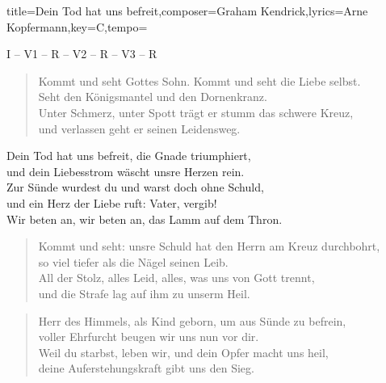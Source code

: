 \documentclass{leadsheet}
\begin{document}
\begin{song}{title={Dein Tod hat uns befreit},composer={Graham Kendrick},lyrics={Arne Kopfermann},key={C},tempo={}}

\begin{schedule}
I -- V1 -- R -- V2 -- R -- V3 -- R
\end{schedule}

\begin{intro}
\end{intro}

\begin{verse}
Kommt und seht Gottes Sohn.
Kommt und seht die Liebe selbst. \\
Seht den Königsmantel und den Dornenkranz. \\
Unter Schmerz, unter Spott
trägt er stumm das schwere Kreuz, \\
und verlassen geht er seinen Leidensweg.
\end{verse}

\begin{chorus}
Dein Tod hat uns befreit,
die Gnade triumphiert, \\
und dein Liebesstrom
wäscht unsre Herzen rein. \\
Zur Sünde wurdest du
und warst doch ohne Schuld, \\
und ein Herz der Liebe ruft: Vater, vergib! \\
Wir beten an, wir beten an,
das Lamm auf dem Thron.
\end{chorus}

\begin{verse}
Kommt und seht: unsre Schuld
hat den Herrn am Kreuz durchbohrt, \\
so viel tiefer als die Nägel seinen Leib. \\
All der Stolz, alles Leid,
alles, was uns von Gott trennt, \\
und die Strafe lag auf ihm zu unserm Heil.
\end{verse}

\begin{verse}
Herr des Himmels, als Kind geborn,
um aus Sünde zu befrein, \\
voller Ehrfurcht beugen wir uns nun vor dir. \\
Weil du starbst, leben wir,
und dein Opfer macht uns heil, \\
deine Auferstehungskraft gibt uns den Sieg.
\end{verse}

\end{song}
\end{document}
